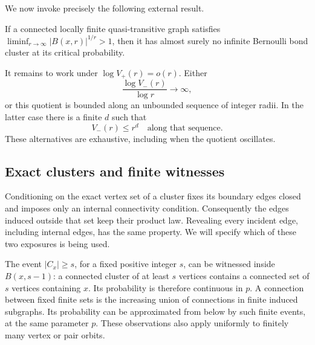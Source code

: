 We now invoke precisely the following external result.
\begin{theorem}
\label{thm:exponential}
If a connected locally finite quasi-transitive graph satisfies
$\liminf_{r\to\infty}|B(x,r)|^{1/r}>1$, then it has almost surely no
infinite Bernoulli bond cluster at its critical probability.
\end{theorem}

It remains to work under $\log V_+(r)=o(r)$. Either
\begin{equation}
\label{eq:superpoly-growth}
 \frac{\log V_-(r)}{\log r}\longrightarrow\infty,
\end{equation}
or this quotient is bounded along an unbounded sequence of integer
radii. In the latter case there is a finite $d$ such that
\begin{equation}
\label{eq:polynomial-subsequence}
 V_-(r)\le r^d
 \quad\text{along that sequence.}
\end{equation}
These alternatives are exhaustive, including when the quotient
oscillates.

\subsection{Exact clusters and finite witnesses}

Conditioning on the exact vertex set of a cluster fixes its boundary
edges closed and imposes only an internal connectivity condition.
Consequently the edges induced outside that set keep their product
law. Revealing every incident edge, including internal edges,
has the same property. We will specify which of these two exposures
is being used.

The event $|C_x|\ge s$, for a fixed positive integer $s$, can be
witnessed inside $B(x,s-1)$: a connected cluster of at least $s$
vertices contains a connected set of $s$ vertices containing $x$.
Its probability is therefore continuous in $p$. A connection between
fixed finite sets is the increasing union of connections in finite
induced subgraphs. Its probability can be approximated from below
by such finite events, at the same parameter $p$. These observations
also apply uniformly to finitely many vertex or pair orbits.
